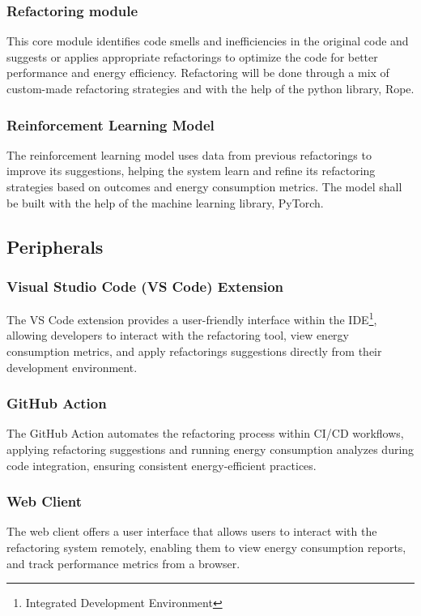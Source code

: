 \documentclass{article}
\begin{document}
\subsubsection*{Refactoring module}
This core module identifies code smells and inefficiencies in the original code and suggests or applies appropriate refactorings to optimize the code for better performance and energy efficiency. Refactoring will be done through a mix of custom-made refactoring strategies and with the help of the python library, Rope.

\subsubsection*{Reinforcement Learning Model}
The reinforcement learning model uses data from previous refactorings to improve its suggestions, helping the system learn and refine its refactoring strategies based on outcomes and energy consumption metrics. The model shall be built with the help of the machine learning library, PyTorch.

\subsection{Peripherals}

\subsubsection*{Visual Studio Code (VS Code) Extension}
The VS Code extension provides a user-friendly interface within the IDE\footnote{Integrated Development Environment}, allowing developers to interact with the refactoring tool, view energy consumption metrics, and apply refactorings suggestions directly from their development environment.

\subsubsection*{GitHub Action}
The GitHub Action automates the refactoring process within CI/CD workflows, applying refactoring suggestions and running energy consumption analyzes during code integration, ensuring consistent energy-efficient practices.

\subsubsection*{Web Client}
The web client offers a user interface that allows users to interact with the refactoring system remotely, enabling them to view energy consumption reports, and track performance metrics from a browser.
\end{document}
